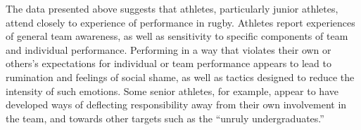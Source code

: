 \begin{CJK}{UTF8}{gbsn}








The data presented above suggests that athletes, particularly junior athletes, attend closely to experience of performance in rugby.  Athletes report experiences of general team awareness, as well as sensitivity to specific components of team and individual performance.
Performing in a way that violates their own or others's expectations for individual or team performance appears to lead to rumination and feelings of social shame, as well as tactics designed to reduce the intensity of such emotions.  Some senior athletes, for example, appear to have developed ways of deflecting responsibility away from their own involvement in the team, and towards other targets such as the ``unruly undergraduates.''



\end{CJK}
